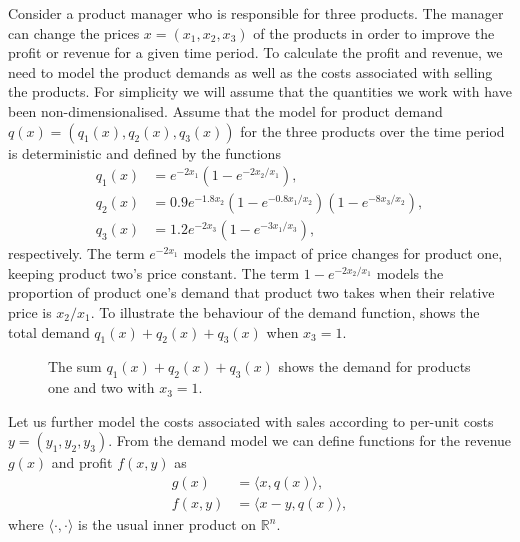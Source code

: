 \documentclass[main.tex]{subfiles}
\begin{document}
Consider a product manager who is responsible for three products.
The manager can change the prices
$x=(x_1,x_2,x_3)$
of the products in order to improve the profit or revenue for a given
time period.
To calculate the profit and revenue, we need to model the product
demands as well as the costs associated with selling the products.
For simplicity we will assume that the quantities we work with have
been non-dimensionalised.
Assume that the model for product demand $q(x)=(q_1(x),q_2(x),q_3(x))$
for the three products over the time period is
deterministic and defined by the functions
\begin{align}
  q_1(x) &= e^{-2x_1}(1-e^{-2x_2/x_1}),\\
  q_2(x) &= 0.9e^{-1.8x_2}(1-e^{-0.8x_1/x_2})(1-e^{-8x_3/x_2}),\\
  q_3(x) &= 1.2e^{-2x_3}(1-e^{-3x_1/x_3}),
\end{align}
respectively.
The term $e^{-2x_1}$  models the impact of price
changes for product one, keeping product two's price constant.
The term $1-e^{-2x_2/x_1}$ models the proportion of product one's
demand that product two takes when their relative price is $x_2/x_1$.
To illustrate the behaviour of the demand function,
 shows the total demand $q_1(x)+q_2(x)+q_3(x)$ when
$x_3=1$.
\begin{figure}[htbp]
  \centering
  \caption[Demand for three products]{The sum $q_1(x)+q_2(x)+q_3(x)$ shows the demand for products one
    and two with $x_3=1$.
  }\label{fig:total_volume_2d}
\end{figure}

Let us further model the costs associated with sales according to per-unit
costs $y=(y_1,y_2,y_3)$.
From the demand model we can define functions for the revenue $g(x)$ and profit
$f(x,y)$ as
\begin{align}
  g(x)&=\langle x,q(x) \rangle,\\
  f(x,y)
      &=\langle x-y,q(x) \rangle,
\end{align}
where $\langle \cdot,\cdot \rangle$ is the usual inner product on
$\mathbb{R}^n$.
\end{document}
